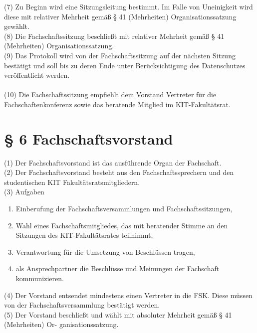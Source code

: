 \documentclass[a4paper, parskip=half, numbers=noenddot]{scrartcl}
\begin{document}
(7) Zu Beginn wird eine Sitzungsleitung bestimmt. Im Falle von Uneinigkeit wird diese mit relativer Mehrheit gemäß § 41 (Mehrheiten) Organisationssatzung gewählt.\\

(8) Die Fachschaftssitzung beschließt mit relativer Mehrheit gemäß § 41 (Mehrheiten) Organisationssatzung.\\

(9) Das Protokoll wird von der Fachschaftssitzung auf der nächsten Sitzung bestätigt und soll bis zu deren Ende unter Berücksichtigung des Datenschutzes veröffentlicht werden.\\\\

(10) Die Fachschaftssitzung empfiehlt dem Vorstand Vertreter für die Fachschaftenkonferenz sowie das beratende Mitglied im KIT-Fakultätsrat.



%
%

\section*{§ 6 Fachschaftsvorstand}

(1) Der Fachschaftsvorstand ist das ausführende Organ der Fachschaft.\\

(2) Der Fachschaftsvorstand besteht aus den Fachschaftssprechern und den studentischen KIT Fakultätsratsmitgliedern.\\

(3) Aufgaben

\begin{enumerate}
    \item  Einberufung der Fachschaftsversammlungen und Fachschaftssitzungen,
    \item Wahl eines Fachschaftsmitgliedes, das mit beratender Stimme an den Sitzungen des KIT-Fakultätsrates teilnimmt,
    \item Verantwortung für die Umsetzung von Beschlüssen tragen,
    \item als Ansprechpartner die Beschlüsse und Meinungen der Fachschaft kommunizieren.
\end{enumerate}

(4) Der Vorstand entsendet mindestens einen Vertreter in die FSK. Diese müssen von der
Fachschaftsversammlung bestätigt werden.\\

(5) Der Vorstand beschließt und wählt mit absoluter Mehrheit gemäß § 41 (Mehrheiten) Or-
ganisationssatzung.\\
\end{document}
